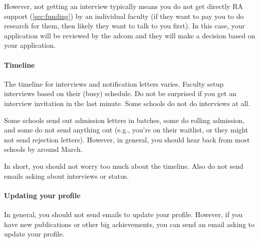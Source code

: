 \documentclass[oneside,11pt]{memoir}
\begin{document}
However, not getting an interview typically means you do not get directly RA support (\autoref{sec:funding}) by an individual faculty (if they want to pay you to do research for them, then likely they want to talk to you first).  In this case, your application will be reviewed by the adcom and they will make a decision based on your application.

\paragraph{Timeline} The timeline for interviews and notification letters varies.  Faculty setup interviews based on their (busy) schedule. Do not be surprised if you get an interview invitation in the last minute. Some schools do not do interviews at all.

Some schools send out admission letters in batches, some do rolling admission, and some do not send anything out (e.g., you're on their waitlist, or they might not send rejection letters).  However, in general, you should hear back from most schools by around March.

In short, you should not worry too much about the timeline. Also do not send emails asking about interviews or status.


\paragraph{Updating your profile} In general, you should not send emails to update your profile.  However, if you have new publications or other big achievements, you can send an email asking to update your profile.




\end{document}

